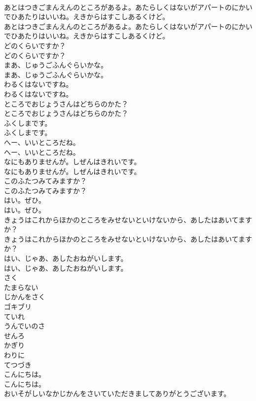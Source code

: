 \documentclass[8pt]{extreport}
\begin{document}
\begin{CJK}{UTF8}{min}
\\	あとはつきごまんえんのところがあるよ。あたらしくはないがアパートのにかいでひあたりはいいね。えきからはすこしあるくけど。
\\	あとはつきごまんえんのところがあるよ。あたらしくはないがアパートのにかいでひあたりはいいね。えきからはすこしあるくけど。
\\	どのくらいですか？
\\	どのくらいですか？
\\	まあ、じゅうごふんぐらいかな。
\\	まあ、じゅうごふんぐらいかな。
\\	わるくはないですね。
\\	わるくはないですね。
\\	ところでおじょうさんはどちらのかた？
\\	ところでおじょうさんはどちらのかた？
\\	ふくしまです。
\\	ふくしまです。
\\	へー、いいところだね。
\\	へー、いいところだね。
\\	なにもありませんが。しぜんはきれいです。
\\	なにもありませんが。しぜんはきれいです。
\\	このふたつみてみますか？
\\	このふたつみてみますか？
\\	はい。ぜひ。
\\	はい。ぜひ。
\\	きょうはこれからほかのところをみせないといけないから、あしたはあいてますか？
\\	きょうはこれからほかのところをみせないといけないから、あしたはあいてますか？
\\	はい、じゃあ、あしたおねがいします。
\\	はい、じゃあ、あしたおねがいします。
\\	さく
\\	たまらない
\\	じかんをさく
\\	ゴキブリ
\\	ていれ
\\	うんでいのさ
\\	せんろ
\\	かぎり
\\	わりに
\\	てつづき
\\	こんにちは。
\\	こんにちは。
\\	おいそがしいなかじかんをさいていただきましてありがとうございます。

\end{CJK}
\end{document}
